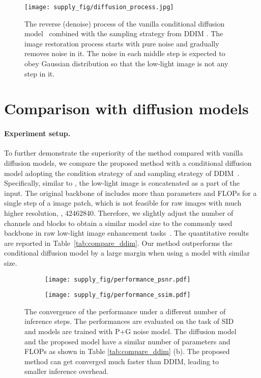 \documentclass[10pt,twocolumn,letterpaper]{article}
\begin{document}
\begin{figure}[t]
    \centering
    \texttt{[image: supply\_fig/diffusion\_process.jpg]}
    \caption{The reverse (denoise) process of the vanilla conditional diffusion model~\cite{saharia2022image} combined with the sampling strategy from DDIM \cite{song2020denoising}. The image restoration process starts with pure noise and gradually removes noise in it. The noise in each middle step is expected to obey Gaussian distribution so that the low-light image is not any step in it.}
    \label{fig:diffusion_x0}
\end{figure}

\section{Comparison with diffusion models}
\paragraph{Experiment setup.} To further demonstrate the superiority of the method compared with vanilla diffusion models, we compare the proposed method with a conditional diffusion model adopting the condition strategy of \cite{saharia2022image} and sampling strategy of DDIM~\cite{song2020denoising}. Specifically, similar to \cite{saharia2022image}, the low-light image is concatenated as a part of the input. 
The original backbone of \cite{song2020denoising} includes more than  parameters and  FLOPs for a single step of a  image patch, which is not feasible for raw images with much higher resolution, \eg, 42462840.
Therefore, we slightly adjust the number of channels and blocks to obtain a similar model size to the commonly used backbone in raw low-light image enhancement tasks~\cite{wei2020physics,feng2022learnability}. The quantitative results are reported in Table~\ref{tab:compare_ddim}. Our method outperforms the conditional diffusion model by a large margin when using a model with similar size.



\begin{figure}[t]
    \centering
    \begin{subfigure}{0.49\linewidth}
\texttt{[image: supply\_fig/performance\_psnr.pdf]}
\end{subfigure}
\begin{subfigure}{0.49\linewidth}
\texttt{[image: supply\_fig/performance\_ssim.pdf]}
\end{subfigure}
    \caption{The convergence of the performance under a different number of inference steps. The performances are evaluated on the  task of SID~\cite{chen2018learning} and models are trained with P+G noise model. The diffusion model and the proposed model have a similar number of parameters and FLOPs as shown in Table \ref{tab:compare_ddim} (b). The proposed method can get converged much faster than DDIM, leading to smaller inference overhead.}
    \label{fig:convergence}
\end{figure}
\end{document}
